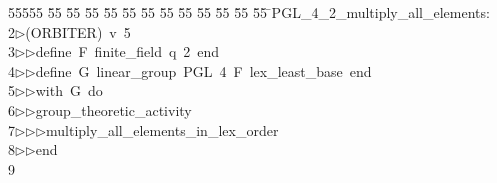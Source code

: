 %
%
\begin{tabbing}
55555 \= 55 \= 55 \= 55 \= 55 \= 55 \= 55 \= 55 \= 55 \= 55 \= 55 \= 55 \= 55 \= \>PGL\_4\_2\_multiply\_all\_elements:\\[0pt]
2\>$\triangleright$\>(ORBITER)\ v\ 5\ \\[0pt]
3\>$\triangleright$\>$\triangleright$\>define\ F\ finite\_field\ q\ 2\ end\ \\[0pt]
4\>$\triangleright$\>$\triangleright$\>define\ G\ linear\_group\ PGL\ 4\ F\ lex\_least\_base\ end\ \\[0pt]
5\>$\triangleright$\>$\triangleright$\>with\ G\ do\ \\[0pt]
6\>$\triangleright$\>$\triangleright$\>group\_theoretic\_activity\ \\[0pt]
7\>$\triangleright$\>$\triangleright$\>$\triangleright$\>multiply\_all\_elements\_in\_lex\_order\ \\[0pt]
8\>$\triangleright$\>$\triangleright$\>end\\[0pt]
9\>\end{tabbing}
